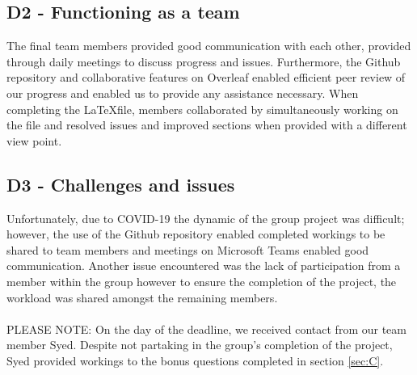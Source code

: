\documentclass[a4paper,10pt,reqno]{amsart}
\numberwithin{equation}{section}
\begin{document}
\subsection{D2 - Functioning as a team}
\par The final team members provided good communication with each other, provided through daily meetings to discuss progress and issues. Furthermore, the Github repository and collaborative features on Overleaf enabled efficient peer review of our progress and enabled us to provide any assistance necessary.  When completing the \LaTeX\;file, members collaborated by simultaneously working on the file and resolved issues and improved sections when provided with a different view point.


\subsection{D3 - Challenges and issues}
\par Unfortunately, due to COVID-19 the dynamic of the group project was difficult; however, the use of the Github repository enabled completed workings to be shared to team members and meetings on Microsoft Teams enabled good communication. Another issue encountered was the lack of participation from a member within the group however to ensure the completion of the project, the workload was shared amongst the remaining members.\\
\\
PLEASE NOTE: On the day of the deadline, we received contact from our team member Syed. Despite not partaking in the group's completion of the project, Syed provided workings to the bonus questions completed in section \ref{sec:C}. 
\end{document}
